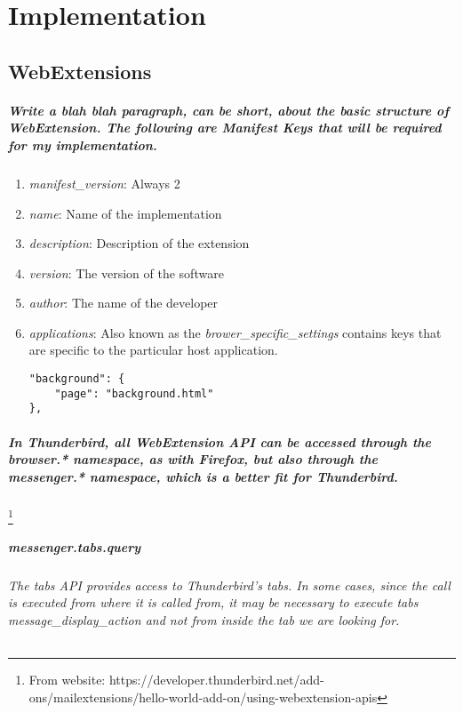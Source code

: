 \chapter{Implementation}


\section{WebExtensions}
\paragraph{Write a blah blah paragraph, can be short, about the basic structure of WebExtension. The following are Manifest Keys that will be required for my implementation.}

\begin{enumerate}
\item \emph{manifest\_version}: Always 2
\item \emph{name}: Name of the implementation
\item \emph{description}: Description of the extension
\item \emph{version}: The version of the software
\item \emph{author}: The name of the developer
\item \emph{applications}: Also known as the \emph{brower\_specific\_settings} contains keys that are specific to the particular host application. 
\begin{center}
\begin{verbatim}
"background": {
    "page": "background.html"
},
\end{verbatim}
\end{center}
\end{enumerate}


\paragraph{In Thunderbird, all WebExtension API can be accessed through the browser.* namespace, as with Firefox, but also through the messenger.* namespace, which is a better fit for Thunderbird.}\footnote{From website: https://developer.thunderbird.net/add-ons/mailextensions/hello-world-add-on/using-webextension-apis}

\paragraph{messenger.tabs.query}
\subparagraph{The tabs API provides access to Thunderbird's tabs. In some cases, since the call is executed from where it is called from, it may be necessary to execute tabs \emph{message\_display\_action} and not from inside the tab we are looking for.}

